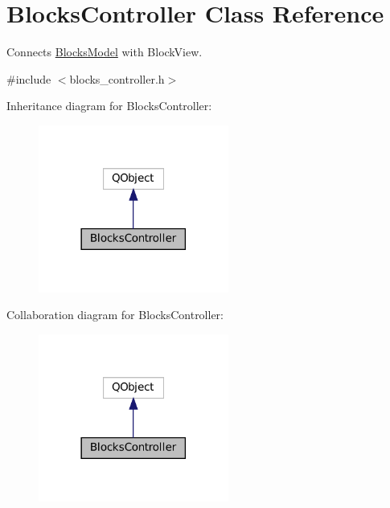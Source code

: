\hypertarget{class_blocks_controller}{}\section{Blocks\+Controller Class Reference}
\label{class_blocks_controller}


Connects \mbox{\hyperlink{class_blocks_model}{Blocks\+Model}} with Block\+View.  




{\ttfamily \#include $<$blocks\+\_\+controller.\+h$>$}



Inheritance diagram for Blocks\+Controller\+:
\nopagebreak
\begin{figure}[H]
\begin{center}
\leavevmode
\includegraphics[width=177pt]{class_blocks_controller__inherit__graph}
\end{center}
\end{figure}


Collaboration diagram for Blocks\+Controller\+:
\nopagebreak
\begin{figure}[H]
\begin{center}
\leavevmode
\includegraphics[width=177pt]{class_blocks_controller__coll__graph}
\end{center}
\end{figure}
